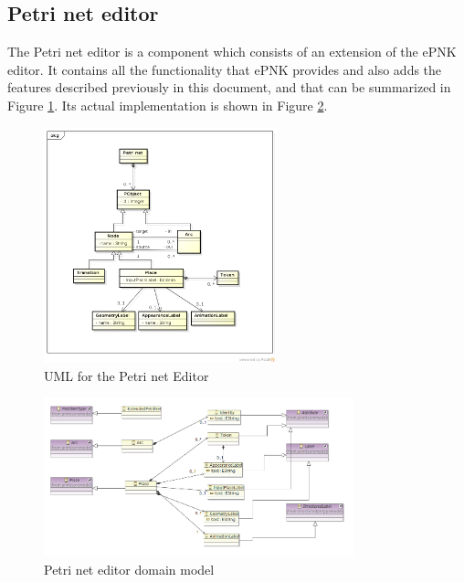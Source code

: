 \subsection{Petri net editor}

The Petri net editor is a component which consists of an extension of the ePNK editor. It contains all the functionality that ePNK provides and also adds the features described previously in this document, and that can be summarized in Figure \ref{fig:uml-petrinet-editor}. Its actual implementation is shown in Figure \ref{fig:petri-net-domain-model}.

\begin{figure}[htp]
\begin{center}
  \includegraphics[width=0.6\textwidth]{image/petrinet_uml.png}
  \caption{UML for the Petri net Editor}
  \label{fig:uml-petrinet-editor}
\end{center}
\end{figure}

\begin{figure}[htp]
\begin{center}
  \includegraphics[width=0.8\textwidth]{image/petrinet_editor_domain.png}
  \caption{Petri net editor domain model}
  \label{fig:petri-net-domain-model}
\end{center}
\end{figure}

